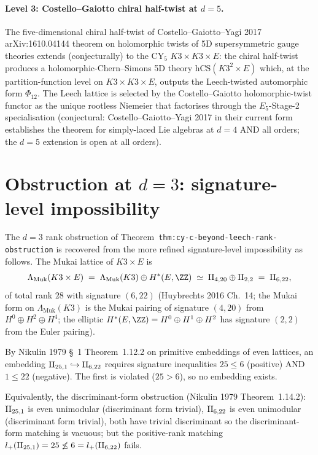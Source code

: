 \paragraph{Level 3: Costello--Gaiotto chiral half-twist at $d = 5$.}
The five-dimensional chiral half-twist of
Costello--Gaiotto--Yagi 2017 arXiv:1610.04144 theorem on
holomorphic twists of 5D supersymmetric gauge theories extends
(conjecturally) to the CY$_5$ $K3 \times K3 \times E$: the
chiral half-twist produces a holomorphic-Chern--Simons 5D theory
$\mathrm{hCS}(K3^2 \times E)$ which, at the partition-function level
on $K3 \times K3 \times E$, outputs the Leech-twisted automorphic
form $\Phi_{12}$. The Leech lattice is selected by the
Costello--Gaiotto holomorphic-twist functor as the unique rootless
Niemeier that factorises through the $E_5$-Stage-2 specialisation
(conjectural: Costello--Gaiotto--Yagi 2017 in their current
form establishes the theorem for simply-laced Lie algebras at $d = 4$
AND all orders; the $d = 5$ extension is open at all orders).

\section*{Obstruction at $d = 3$: signature-level impossibility}

The $d = 3$ rank obstruction of
Theorem~\texttt{thm:cy-c-beyond-leech-rank-obstruction} is recovered
from the more refined signature-level impossibility as follows.
The Mukai lattice of $K3 \times E$ is
\[
  \Lambda_{\mathrm{Muk}}(K3 \times E)
  \;=\;
  \Lambda_{\mathrm{Muk}}(K3) \oplus H^*(E, \ZZ)
  \;\simeq\;
  \II{4, 20} \oplus \II{2, 2}
  \;=\;
  \II{6, 22},
\]
of total rank $28$ with signature $(6, 22)$
(Huybrechts 2016 Ch.~14; the Mukai form on $\Lambda_{\mathrm{Muk}}
(K3)$ is the Mukai pairing of signature $(4, 20)$ from
$H^0 \oplus H^2 \oplus H^4$; the elliptic $H^*(E, \ZZ) = H^0 \oplus
H^1 \oplus H^2$ has signature $(2, 2)$ from the Euler pairing).

By Nikulin 1979 \S~1 Theorem~1.12.2 on primitive embeddings of even
lattices, an embedding $\mathrm{II}_{25,1} \hookrightarrow \mathrm{II}_{6, 22}$
requires signature inequalities $25 \leq 6$ (positive) AND
$1 \leq 22$ (negative). The first is violated ($25 > 6$), so no
embedding exists.

Equivalently, the discriminant-form obstruction (Nikulin 1979
Theorem~1.14.2): $\mathrm{II}_{25,1}$ is even unimodular (discriminant form
trivial), $\mathrm{II}_{6, 22}$ is even unimodular (discriminant form
trivial), both have trivial discriminant so the discriminant-form
matching is vacuous; but the positive-rank matching
$l_+(\mathrm{II}_{25,1}) = 25 \not\leq 6 = l_+(\mathrm{II}_{6, 22})$ fails.

